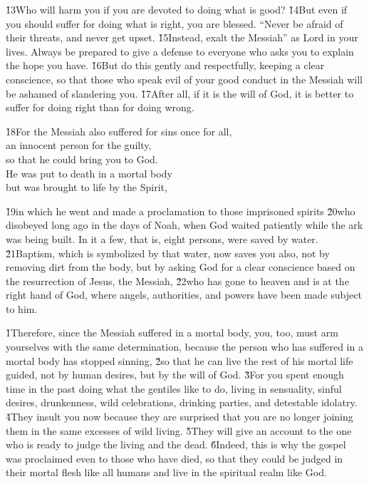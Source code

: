 \v{13}Who will harm you if you are devoted to doing what is good? \v{14}But even if you should suffer for doing what is right, you are blessed. ``Never be afraid of their threats, and never get upset. \v{15}Instead, exalt the Messiah'' as Lord in your lives. Always be prepared to give a defense to everyone who asks you to explain the hope you have. \v{16}But do this gently and respectfully, keeping a clear conscience, so that those who speak evil of your good conduct in the Messiah will be ashamed of slandering you. \v{17}After all, if it is the will of God, it is better to suffer for doing right than for doing wrong.

\begin{poetry}
\poeml \v{18}For the Messiah also suffered for sins once for all, \\
\poemll    an innocent person for the guilty, \\
\poemlll       so that he could bring you to God. \\
\poeml He was put to death in a mortal body \\
\poemll    but was brought to life by the Spirit,
\end{poetry}

\v{19}in which he went and made a proclamation to those imprisoned spirits \v{20}who disobeyed long ago in the days of Noah, when God waited patiently while the ark was being built. In it a few, that is, eight persons, were saved by water. \v{21}Baptism, which is symbolized by that water, now saves you also, not by removing dirt from the body, but by asking God for a clear conscience based on the resurrection of Jesus, the Messiah, \v{22}who has gone to heaven and is at the right hand of God, where angels, authorities, and powers have been made subject to him.

\v{1}Therefore, since the Messiah suffered in a mortal body, you, too, must arm yourselves with the same determination, because the person who has suffered in a mortal body has stopped sinning, \v{2}so that he can live the rest of his mortal life guided, not by human desires, but by the will of God. \v{3}For you spent enough time in the past doing what the gentiles like to do, living in sensuality, sinful desires, drunkenness, wild celebrations, drinking parties, and detestable idolatry. \v{4}They insult you now because they are surprised that you are no longer joining them in the same excesses of wild living. \v{5}They will give an account to the one who is ready to judge the living and the dead. \v{6}Indeed, this is why the gospel was proclaimed even to those who have died, so that they could be judged in their mortal flesh like all humans and live in the spiritual realm like God.

